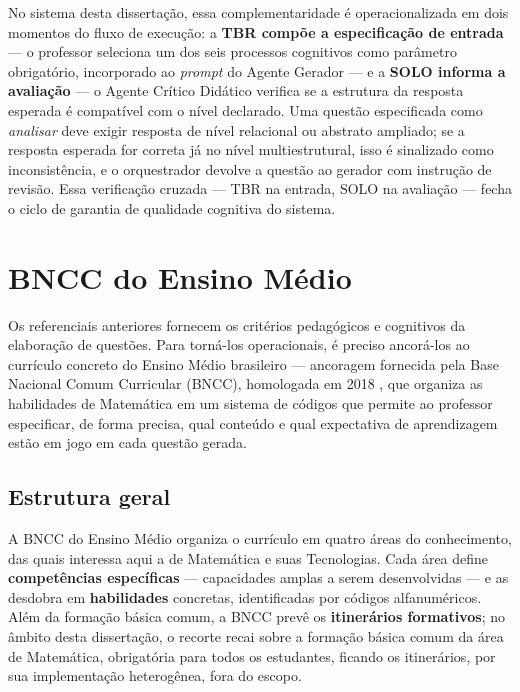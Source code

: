 No sistema desta dissertação, essa complementaridade é operacionalizada em dois momentos do fluxo de
execução: a \textbf{TBR compõe a especificação de entrada} --- o professor seleciona um dos seis
processos cognitivos como parâmetro obrigatório, incorporado ao \emph{prompt} do Agente Gerador --- e a
\textbf{SOLO informa a avaliação} --- o Agente Crítico Didático verifica se a estrutura da resposta
esperada é compatível com o nível declarado. Uma questão especificada como \emph{analisar} deve exigir
resposta de nível relacional ou abstrato ampliado; se a resposta esperada for correta já no nível
multiestrutural, isso é sinalizado como inconsistência, e o orquestrador devolve a questão ao gerador
com instrução de revisão. Essa verificação cruzada --- TBR na entrada, SOLO na avaliação --- fecha o
ciclo de garantia de qualidade cognitiva do sistema.

\section{BNCC do Ensino Médio}
\label{sec:bncc}

Os referenciais anteriores fornecem os critérios pedagógicos e cognitivos da elaboração de questões.
Para torná-los operacionais, é preciso ancorá-los ao currículo concreto do Ensino Médio brasileiro ---
ancoragem fornecida pela Base Nacional Comum Curricular (BNCC), homologada em 2018
\citep{brasil2018bncc}, que organiza as habilidades de Matemática em um sistema de códigos que permite
ao professor especificar, de forma precisa, qual conteúdo e qual expectativa de aprendizagem estão em
jogo em cada questão gerada.

\subsection{Estrutura geral}
\label{sub:bncc-estrutura}

A BNCC do Ensino Médio organiza o currículo em quatro áreas do conhecimento, das quais interessa aqui a
de Matemática e suas Tecnologias. Cada área define \textbf{competências específicas} --- capacidades
amplas a serem desenvolvidas --- e as desdobra em \textbf{habilidades} concretas, identificadas por
códigos alfanuméricos. Além da formação básica comum, a BNCC prevê os \textbf{itinerários formativos};
no âmbito desta dissertação, o recorte recai sobre a formação básica comum da área de Matemática,
obrigatória para todos os estudantes, ficando os itinerários, por sua implementação heterogênea, fora
do escopo.

